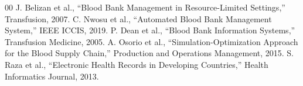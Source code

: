 \documentclass[conference]{IEEEtran}
\begin{document}
\begin{thebibliography}{00}
 J. Belizan et al., ``Blood Bank Management in Resource-Limited Settings,'' Transfusion, 2007.
 C. Nwosu et al., ``Automated Blood Bank Management System,'' IEEE ICCIS, 2019.
 P. Dean et al., ``Blood Bank Information Systems,'' Transfusion Medicine, 2005.
 A. Osorio et al., ``Simulation-Optimization Approach for the Blood Supply Chain,'' Production and Operations Management, 2015.
 S. Raza et al., ``Electronic Health Records in Developing Countries,'' Health Informatics Journal, 2013.
\end{thebibliography}
\end{document}

